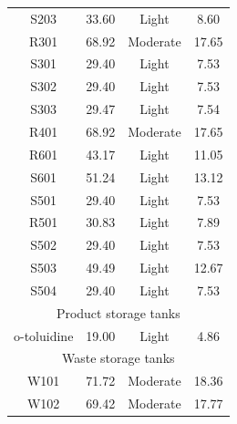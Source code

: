 \begin{table}[H]
\begin{tabular}{cccc}
S203                    & 33.60          & Light                     & 8.60                               \\
R301                    & 68.92          & Moderate                  & 17.65                              \\
S301                    & 29.40          & Light                     & 7.53                               \\
S302                    & 29.40          & Light                     & 7.53                               \\
S303                    & 29.47          & Light                     & 7.54                               \\
R401                    & 68.92          & Moderate                  & 17.65                              \\
R601                    & 43.17          & Light                     & 11.05                              \\
S601                    & 51.24          & Light                     & 13.12                              \\
S501                    & 29.40          & Light                     & 7.53                               \\
R501                    & 30.83          & Light                     & 7.89                               \\
S502                    & 29.40          & Light                     & 7.53                               \\
S503                    & 49.49          & Light                     & 12.67                              \\
S504                    & 29.40          & Light                     & 7.53                               \\\hline
\multicolumn{4}{c}{Product   storage tanks}                                                      \\\hline
o-toluidine             & 19.00          & Light                     & 4.86                               \\\hline
\multicolumn{4}{c}{Waste   storage tanks}                                                        \\\hline
W101                    &   71.72             &     Moderate                      &   18.36                                 \\
W102                    &   69.42             &     Moderate                      &  17.77                              \\\hline

\end{tabular}
\end{table}
